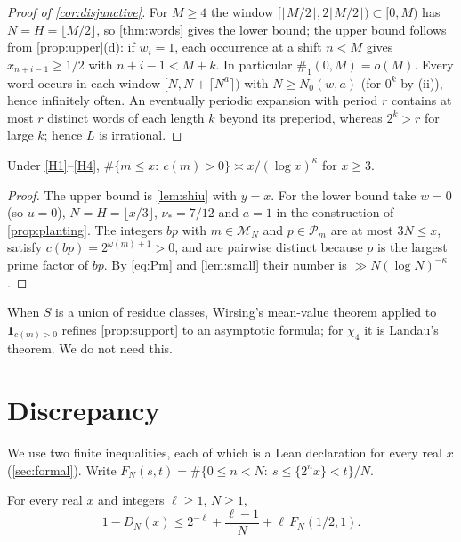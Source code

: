 \documentclass[11pt]{article}
\newcommand{\ind}{\mathbf 1}
\newcommand{\Mset}{\mathcal M}
\newcommand{\Pset}{\mathcal P}
\newcommand{\cnt}{\#}
\begin{document}
\begin{proof}[Proof of \cref{cor:disjunctive}]
For $M\ge4$ the window $[\lfloor M/2\rfloor,2\lfloor M/2\rfloor)\subset[0,M)$ has
$N=H=\lfloor M/2\rfloor$, so \cref{thm:words} gives the lower bound; the upper
bound follows from \cref{prop:upper}(d): if $w_i=1$, each occurrence at a
shift $n<M$ gives $x_{n+i-1}\ge1/2$ with $n+i-1<M+k$.
In particular $\cnt_1(0,M)=o(M)$. Every word occurs in each window
$[N,N+\lceil N^a\rceil)$ with $N\ge N_0(w,a)$ (for $0^k$ by (ii)), hence
infinitely often. An eventually periodic expansion with period $r$ contains at
most $r$ distinct words of each length $k$ beyond its preperiod, whereas
$2^k>r$ for large $k$; hence $L$ is irrational.
\end{proof}

\begin{proposition}\label{prop:support}
Under \ref{H1}--\ref{H4},
$\#\{m\le x:\ c(m)>0\}\asymp x/(\log x)^{\kappa}$ for $x\ge3$.
\end{proposition}

\begin{proof}
The upper bound is \cref{lem:shiu} with $y=x$. For the lower bound take $w=0$
(so $u=0$), $N=H=\lfloor x/3\rfloor$, $\nu_*=7/12$ and $a=1$ in the construction of
\cref{prop:planting}. The integers $bp$ with $m\in\Mset_N$ and $p\in\Pset_m$ are
at most $3N\le x$, satisfy $c(bp)=2^{\omega(m)+1}>0$, and are pairwise distinct
because $p$ is the largest prime factor of $bp$. By \eqref{eq:Pm} and
\cref{lem:small} their number is $\gg N(\log N)^{-\kappa}$.
\end{proof}

When $S$ is a union of residue classes, Wirsing's mean-value theorem
\cite[Satz~1, p.~76]{Wirsing1961} applied to $\ind_{c(m)>0}$ refines
\cref{prop:support} to an asymptotic formula; for $\chi_4$ it is Landau's theorem.
We do not need this.

\section{Discrepancy}\label{sec:discrepancy}

We use two finite inequalities, each of which is a Lean declaration for every
real $x$ (\cref{sec:formal}). Write
$F_N(s,t)=\#\{0\le n<N:\ s\le\{2^nx\}<t\}/N$.

\begin{lemma}\label{lem:upperlean}
For every real $x$ and integers $\ell\ge1$, $N\ge1$,
\[
1-D_N(x)\le2^{-\ell}+\frac{\ell-1}N+\ell\,F_N(1/2,1).
\]
\end{lemma}
\end{document}
